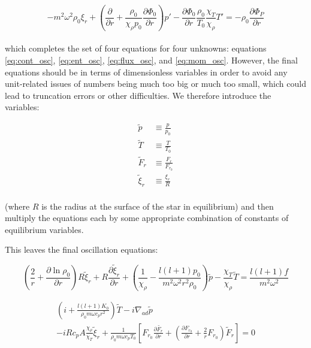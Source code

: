 \documentclass[11pt]{amsart}
\begin{document}
\begin{equation} \label{eq:mom_osc}
- m^{2} \omega^{2} \rho_{0} \xi_{r} 
+ \left( \frac{\partial}{\partial r} + \frac{\rho_{0}}{\chi_{\rho} p_{0}} \frac{\partial \Phi_{0}}{\partial r} \right) p'
-  \frac{\partial \Phi_{0}}{\partial r} \frac{\rho_{0}}{T_{0}} \frac{\chi_{T}}{\chi_{\rho}} T'
=
- \rho_{0} \frac{\partial \Phi_{P}}{\partial r}
\end{equation}
\\
which completes the set of four equations for four unknowns: equations \ref{eq:cont_osc}, \ref{eq:ent_osc}, \ref{eq:flux_osc}, and \ref{eq:mom_osc}.
However, the final equations should be in terms of dimensionless variables in order to avoid
any unit-related issues of numbers being much too big or much too small, which could lead to truncation errors or other difficulties.
We therefore introduce the variables:

\begin{align}
\tilde{p} &\equiv \frac{p}{p_{0}} \\
\tilde{T} &\equiv \frac{T}{T_{0}} \\
\tilde{F}_{r} &\equiv \frac{F_{r}}{F_{r_{0}}} \\
\tilde{\xi}_{r} &\equiv \frac{\xi_{r}}{R}
\end{align}
\\
(where $R$ is the radius at the surface of the star in equilibrium) and then multiply the equations each by some appropriate combination of constants of equilibrium variables.

This leaves the final oscillation equations:

\begin{equation} \label{eq:cont_osc_dim}
\left( \frac{2}{r} + \frac{\partial \ln \rho_{0}}{\partial r} \right) R \tilde{\xi}_{r} + R \frac{\partial \tilde{\xi}_{r}}{\partial r} 
+ \left( \frac{1}{\chi_{\rho}} - \frac{l (l+1) p_{0}}{m^{2} \omega^{2} r^{2} \rho_{0} } \right) \tilde{p}
- \frac{\chi_{T}}{\chi_{\rho}} \tilde{T}
=
\frac{l (l+1) f}{m^{2} \omega^{2}}
\end{equation}

\begin{multline} \label{eq:ent_osc_dim}
\left( i  + \frac{l (l+1) K_{0}}{\rho_{0} m \omega c_{p} r^{2}} \right) \tilde{T}
-  i \nabla_{ad} \tilde{p} \\
- i R c_{p} A \frac{\chi_{\rho}}{\chi_{T}} \tilde{\xi}_{r}
+ \frac{1}{\rho_{0} m \omega c_{p} T_{0}} \left[ F_{r_{0}} \frac{\partial \tilde{F_{r}}}{\partial r} + \left( \frac{\partial F_{r_{0}}}{\partial r} + \frac{2}{r} F_{r_{0}} \right) \tilde{F}_{r} \right]
=
0
\end{multline}
\end{document}
